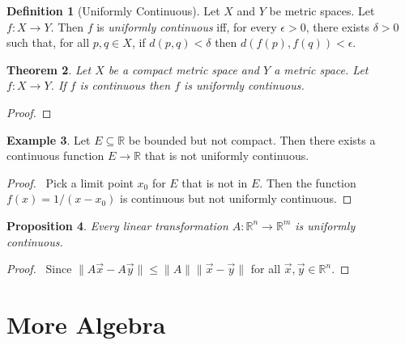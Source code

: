 \documentclass{book}
\let\qed\relax
\newtheorem{prop}{Proposition}[chapter]
\newtheorem{thm}[prop]{Theorem}
\theoremstyle{definition}
\newtheorem{df}[prop]{Definition}
\newtheorem{ex}[prop]{Example}
\begin{document}
\begin{df}[Uniformly Continuous]
Let $X$ and $Y$ be metric spaces. Let $f : X \rightarrow Y$. Then $f$ is \emph{uniformly continuous} iff, for every $\epsilon > 0$, there exists $\delta > 0$ such that, for all $p,q \in X$, if $d(p,q) < \delta$ then $d(f(p),f(q)) < \epsilon$.
\end{df}

\begin{thm}
Let $X$ be a compact metric space and $Y$ a metric space. Let $f : X \rightarrow Y$. If $f$ is continuous then $f$ is uniformly continuous.
\end{thm}

\begin{proof}
\pf
{}
\qed
\end{proof}

\begin{ex}
Let $E \subseteq \mathbb{R}$ be bounded but not compact. Then there exists a continuous function $E \rightarrow \mathbb{R}$ that is not uniformly continuous.
\end{ex}

\begin{proof}
\pf\ Pick a limit point $x_0$ for $E$ that is not in $E$. Then the function $f(x) = 1/(x-x_0)$ is continuous but not uniformly continuous. \qed
\end{proof}

\begin{prop}
Every linear transformation $A : \mathbb{R}^n \rightarrow \mathbb{R}^m$ is uniformly continuous.
\end{prop}

\begin{proof}
\pf\ Since $\| A \vec{x} - A \vec{y} \| \leq \| A \| \| \vec{x} - \vec{y} \|$ for all $\vec{x}, \vec{y} \in \mathbb{R}^n$. \qed
\end{proof}

\part{More Algebra}
\end{document}
